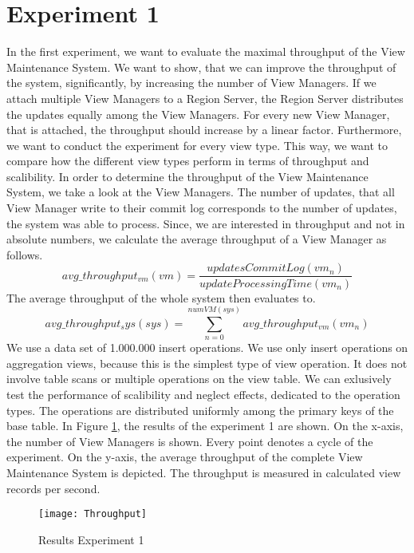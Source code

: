 \documentclass[11pt,a4paper,bibtotoc,idxtotoc,headsepline,footsepline,footexclude,BCOR12mm,DIV13]{scrbook}
\begin{document}
\section{Experiment 1}
\label{sec:experiment1}


In the first experiment, we want to evaluate the maximal throughput of the View Maintenance System. We want to show, that we can improve the throughput of the system, significantly, by increasing the number of View Managers. If we attach multiple View Managers to a Region Server, the Region Server distributes the updates equally among the View Managers. For every new View Manager, that is attached, the throughput should increase by a linear factor. Furthermore, we want to conduct the experiment for every view type. This way, we want to compare how the different view types perform in terms of throughput and scalibility. In order to determine the throughput of the View Maintenance System, we take a look at the View Managers. The number of updates, that all View Manager write to their commit log corresponds to the number of updates, the system was able to process. Since, we are interested in throughput and not in absolute numbers, we calculate the average throughput of a View Manager as follows. 
\[avg\_throughput_{vm}(vm)= \frac{updatesCommitLog(vm_n)}{updateProcessingTime(vm_n)}\] 
The average throughput of the whole system then evaluates to.
\[avg\_throughput_sys(sys)=\sum_{n=0}^{numVM(sys)} avg\_throughput_{vm}(vm_n)\] 
We use a data set of 1.000.000 insert operations.  We use only insert operations on aggregation views, because this is the simplest type of view operation. It does not involve table scans or multiple operations on the view table. We can exlusively test the performance of scalibility and neglect effects, dedicated to the operation types. The operations are distributed uniformly among the primary keys of the base table. In Figure \ref{fig:throughput}, the results of the experiment 1 are shown. On the x-axis, the number of View Managers is shown. Every point denotes a cycle of the experiment. On the y-axis, the average throughput of the complete View Maintenance System is depicted. The throughput is measured in calculated view records per second.

\begin{figure}[h!]
  
  \centering
    \texttt{[image: Throughput]}
    \caption{Results Experiment 1}
    \label{fig:throughput}
\end{figure}
\end{document}
